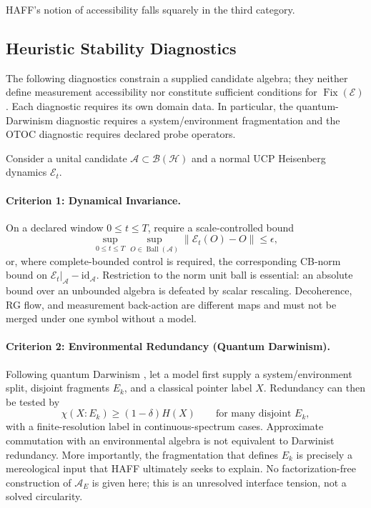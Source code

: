 \documentclass[12pt,a4paper,openany]{book}
\begin{document}
HAFF's notion of accessibility falls squarely in the third category.

\subsection{Heuristic Stability Diagnostics}

The following diagnostics constrain a supplied candidate algebra; they neither define measurement accessibility nor constitute sufficient conditions for $\operatorname{Fix}(\mathcal E)$.  Each diagnostic requires its own domain data.  In particular, the quantum-Darwinism diagnostic requires a system/environment fragmentation and the OTOC diagnostic requires declared probe operators.

Consider a unital candidate $\mathcal A\subset\mathcal B(\mathcal H)$ and a normal UCP Heisenberg dynamics $\mathcal E_t$.

\paragraph{Criterion 1: Dynamical Invariance.}
On a declared window $0\le t\le T$, require a scale-controlled bound
\begin{equation}
\sup_{0\le t\le T}
\sup_{O\in\operatorname{Ball}(\mathcal A)}
\|\mathcal E_t(O)-O\|\le\epsilon,
\end{equation}
or, where complete-bounded control is required, the corresponding CB-norm bound on $\mathcal E_t|_{\mathcal A}-\mathrm{id}_{\mathcal A}$.  Restriction to the norm unit ball is essential: an absolute bound over an unbounded algebra is defeated by scalar rescaling.  Decoherence, RG flow, and measurement back-action are different maps and must not be merged under one symbol without a model.

\paragraph{Criterion 2: Environmental Redundancy (Quantum Darwinism).}
Following quantum Darwinism \cite{Zurek2009}, let a model first supply a system/environment split, disjoint fragments $E_k$, and a classical pointer label $X$.  Redundancy can then be tested by
\begin{equation}
\chi(X:E_k)\ge(1-\delta)H(X)
\qquad\text{for many disjoint }E_k,
\end{equation}
with a finite-resolution label in continuous-spectrum cases.  Approximate commutation with an environmental algebra is not equivalent to Darwinist redundancy.  More importantly, the fragmentation that defines $E_k$ is precisely a mereological input that HAFF ultimately seeks to explain.  No factorization-free construction of $\mathcal A_E$ is given here; this is an unresolved interface tension, not a solved circularity.
\end{document}
